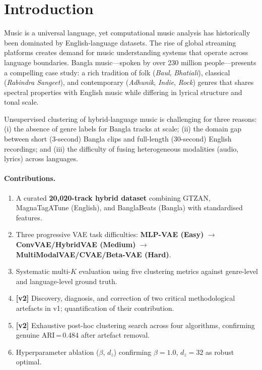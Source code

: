 \documentclass{article}
\begin{document}
\section{Introduction}

Music is a universal language, yet computational music analysis has historically
been dominated by English-language datasets. The rise of global streaming platforms
creates demand for music understanding systems that operate across language boundaries.
Bangla music---spoken by over 230 million people---presents a compelling case study:
a rich tradition of folk (\textit{Baul}, \textit{Bhatiali}), classical
(\textit{Rabindra Sangeet}), and contemporary (\textit{Adhunik}, \textit{Indie},
\textit{Rock}) genres that shares spectral properties with English music while
differing in lyrical structure and tonal scale.

Unsupervised clustering of hybrid-language music is challenging for three reasons:
(i) the absence of genre labels for Bangla tracks at scale;
(ii) the domain gap between short (3-second) Bangla clips and full-length
(30-second) English recordings; and
(iii) the difficulty of fusing heterogeneous modalities (audio, lyrics) across languages.

\paragraph{Contributions.}
\begin{enumerate}
    \item A curated \textbf{20,020-track hybrid dataset} combining GTZAN, MagnaTagATune
          (English), and BanglaBeats (Bangla) with standardised features.
    \item Three progressive VAE task difficulties: \textbf{MLP-VAE (Easy)} $\to$
          \textbf{ConvVAE/HybridVAE (Medium)} $\to$ \textbf{MultiModalVAE/CVAE/Beta-VAE (Hard)}.
    \item Systematic multi-$K$ evaluation using five clustering metrics against
          genre-level and language-level ground truth.
    \item \textbf{[v2]} Discovery, diagnosis, and correction of two critical
          methodological artefacts in v1; quantification of their contribution.
    \item \textbf{[v2]} Exhaustive post-hoc clustering search across four algorithms,
          confirming genuine ARI\,=\,0.484 after artefact removal.
    \item Hyperparameter ablation ($\beta$, $d_z$) confirming $\beta\!=\!1.0$,
          $d_z\!=\!32$ as robust optimal.
\end{enumerate}
\end{document}
